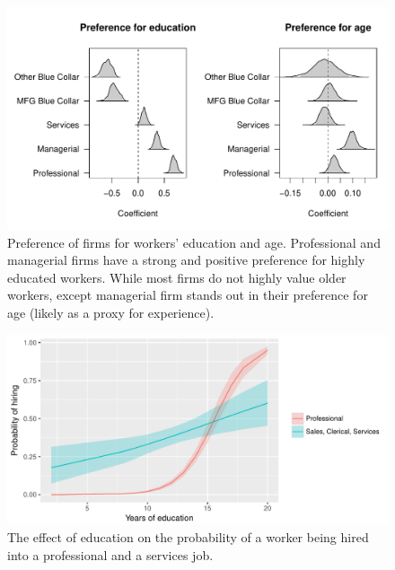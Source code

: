 \begin{figure}[!ht]
  \centering
  \includegraphics[width=\textwidth,keepaspectratio]{../figure/labor_occ5_beta_educ_age}
  \caption[Firms' preference in the US labor market]{Preference of firms for workers' education and
    age. Professional and managerial firms have a strong and positive preference
  for highly educated workers. While most firms do not highly value older workers,
  except managerial firm stands out in their preference for age (likely as a
  proxy for experience).}
  \label{fig:labor_occ5_beta_educ_age}
\end{figure}

\begin{figure}[!ht]
  \centering \includegraphics[width=\textwidth,keepaspectratio]{../figure/labor_occ5_educ_effect_on_hiring}
  \caption[The effect of education on the probability of a worker being hired in
  the US labor market.]{The
    effect of education on the probability of a worker being hired into a professional
    and a services job.}
  \label{fig:labor_occ5_educ_effect_on_hiring}
\end{figure}

